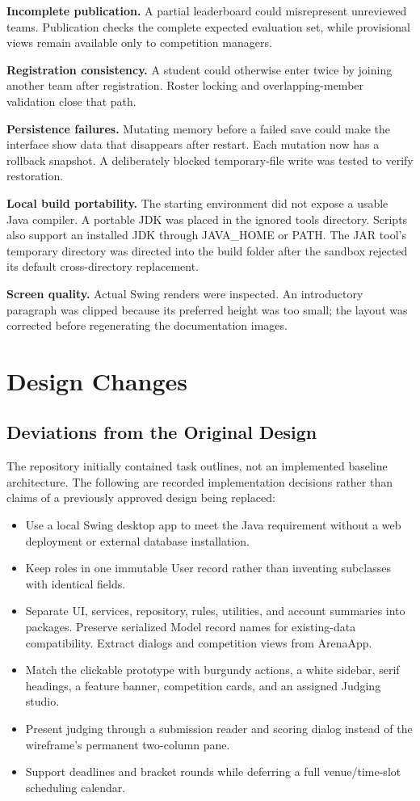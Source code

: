 \documentclass[12pt]{article}
\begin{document}
\textbf{Incomplete publication.} A partial leaderboard could misrepresent unreviewed teams. Publication checks the complete expected evaluation set, while provisional views remain available only to competition managers.

\textbf{Registration consistency.} A student could otherwise enter twice by joining another team after registration. Roster locking and overlapping-member validation close that path.

\textbf{Persistence failures.} Mutating memory before a failed save could make the interface show data that disappears after restart. Each mutation now has a rollback snapshot. A deliberately blocked temporary-file write was tested to verify restoration.

\textbf{Local build portability.} The starting environment did not expose a usable Java compiler. A portable JDK was placed in the ignored tools directory. Scripts also support an installed JDK through JAVA\_HOME or PATH. The JAR tool's temporary directory was directed into the build folder after the sandbox rejected its default cross-directory replacement.

\textbf{Screen quality.} Actual Swing renders were inspected. An introductory paragraph was clipped because its preferred height was too small; the layout was corrected before regenerating the documentation images.

\section{Design Changes}
\subsection{Deviations from the Original Design}
The repository initially contained task outlines, not an implemented baseline architecture. The following are recorded implementation decisions rather than claims of a previously approved design being replaced:
\begin{itemize}
\item Use a local Swing desktop app to meet the Java requirement without a web deployment or external database installation.
\item Keep roles in one immutable User record rather than inventing subclasses with identical fields.
\item Separate UI, services, repository, rules, utilities, and account summaries into packages. Preserve serialized Model record names for existing-data compatibility. Extract dialogs and competition views from ArenaApp.
\item Match the clickable prototype with burgundy actions, a white sidebar, serif headings, a feature banner, competition cards, and an assigned Judging studio.
\item Present judging through a submission reader and scoring dialog instead of the wireframe's permanent two-column pane.
\item Support deadlines and bracket rounds while deferring a full venue/time-slot scheduling calendar.
\end{itemize}
\end{document}
